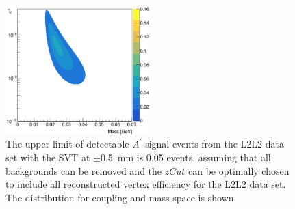 \begin{figure}[htb]
  \centering
      \includegraphics[width=0.5\textwidth]{pics/appendix/reachL2L2_0p5.png}
  \caption[Upper limit of the detectable $A^{\prime}$ signal from the L2L2 data at 0.5~mm]{The upper limit of detectable $A^{\prime}$ signal events from the L2L2 data set with the SVT at $\pm$0.5~mm is 0.05 events, assuming that all backgrounds can be removed and the $zCut$ can be optimally chosen to include all reconstructed vertex efficiency for the L2L2 data set. The distribution for coupling and mass space is shown.}
  \label{fig:rl2l20p5}
\end{figure} 
